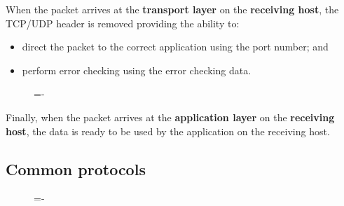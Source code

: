 \documentclass[a4paper]{systems-software}
\begin{document}
When the packet arrives at the \textbf{transport layer} on the \textbf{receiving host}, the TCP/UDP header is removed providing the ability to:
\begin{itemize}
	\item direct the packet to the correct application using the port number; and
	\item perform error checking using the error checking data.
\end{itemize}

\begin{figure}[H]
	\lineskip=-\fboxrule
\end{figure}

Finally, when the packet arrives at the \textbf{application layer} on the \textbf{receiving host}, the data is ready to be used by the application on the receiving host.


\subsection*{Common protocols}

\begin{figure}[H]
	\lineskip=-\fboxrule
\end{figure}
\end{document}
